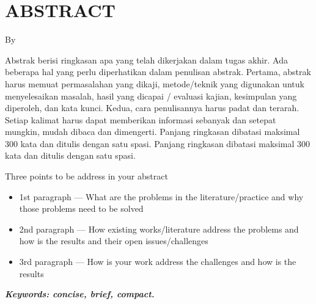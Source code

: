 \clearpage
\chapter*{ABSTRACT}

\begin{center}
  \center
  \large \bfseries \MakeUppercase{\thetitle}

  \normalfont\normalsize
  By

  \theauthor
\end{center}

\vspace{1cm}

\begin{singlespace}

  Abstrak berisi ringkasan apa yang telah dikerjakan dalam tugas akhir. Ada beberapa hal yang perlu diperhatikan dalam penulisan abstrak. Pertama, abstrak harus memuat permasalahan yang dikaji, metode/teknik yang digunakan untuk menyelesaikan masalah, hasil yang dicapai / evaluasi kajian, kesimpulan yang diperoleh, dan kata kunci.  Kedua, cara penulisannya harus padat dan terarah. Setiap kalimat harus dapat memberikan informasi sebanyak dan setepat mungkin, mudah dibaca dan dimengerti. Panjang ringkasan dibatasi maksimal 300 kata dan ditulis dengan satu spasi. Panjang ringkasan dibatasi maksimal 300 kata dan ditulis dengan satu spasi.

  Three points to be address in your abstract

  \begin{itemize}
    \item 1st paragraph — What are the problems in the literature/practice and why those problems need to be solved

    \item 2nd paragraph — How existing works/literature address the problems and how is the results and their open issues/challenges

    \item 3rd paragraph — How is your work address the challenges and how is the results
  \end{itemize}

\end{singlespace}

\textbf{\textit{Keywords: concise, brief, compact.}}
\clearpage